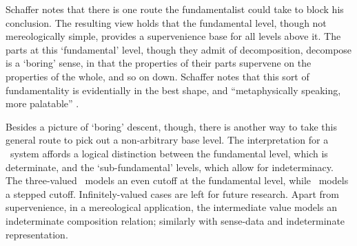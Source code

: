 Schaffer notes that there is one route the fundamentalist could take to block his conclusion. The resulting view holds that the fundamental level, though not mereologically simple, provides a supervenience base for all levels above it. The parts at this `fundamental' level, though they admit of decomposition, decompose is a `boring' sense, in that the properties of their parts supervene on the properties of the whole, and so on down. Schaffer notes that this sort of fundamentality is evidentially in the best shape, and ``metaphysically speaking, more palatable'' \cite[p. 510]{Schaffer:03}. 

Besides a picture of `boring' descent, though, there is another way to take this general route to pick out a non-arbitrary base level. The interpretation for a \GO\ system affords a logical distinction between the fundamental level, which is determinate, and the `sub-fundamental' levels, which allow for indeterminacy. The three-valued \GO\ models an even cutoff at the fundamental level, while \GoFour\ models a stepped cutoff. Infinitely-valued cases are left for future research. Apart from supervenience, in a mereological application, the intermediate value models an indeterminate composition relation; similarly with sense-data and indeterminate representation.

%
%
%